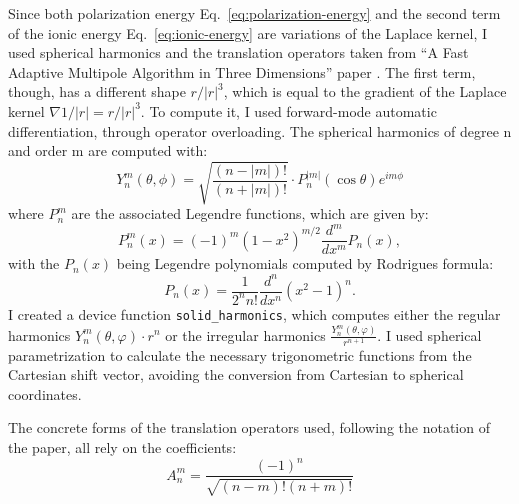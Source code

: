 Since both polarization energy Eq.~\eqref{eq:polarization-energy} and the second term of the ionic energy Eq.~\eqref{eq:ionic-energy} are variations of the Laplace kernel, I used spherical harmonics and the translation operators taken from ``A Fast Adaptive Multipole Algorithm in Three Dimensions'' paper \cite{cheng1999fastadaptive}. 
The first term, though, has a different shape $r/|r|^3$, which is equal to the gradient of the Laplace kernel $\nabla 1/|r| = r/|r|^3$.
To compute it, I used forward-mode automatic differentiation, through operator overloading.
The spherical harmonics of degree n and order m are computed with:
\begin{equation}
    Y_n^m(\theta, \phi) = \sqrt{\frac{(n-|m|)!}{(n+|m|)!}} \cdot P_n^{|m|}(\cos\theta) e^{im\phi}
    \label{eq:spherical-harmonics}
\end{equation}
where $P_n^{m}$ are the associated Legendre functions, which are given by:
\begin{equation}
    P_n^m(x) = (-1)^m (1-x^2)^{m/2} \frac{d^m}{dx^m} P_n(x),
    \label{eq:associated-legendre}
\end{equation}
with the $P_n(x)$ being Legendre polynomials computed by Rodrigues formula:
\begin{equation}
    P_n(x) = \frac{1}{2^n n!} \frac{d^n}{dx^n} (x^2-1)^n.
    \label{eq:legendre-rodrigues}
\end{equation}
I created a device function \texttt{solid\_harmonics}, which computes either the regular harmonics $Y_n^m(\theta,\varphi) \cdot r^n$ or the irregular harmonics $\frac{Y_n^m(\theta,\varphi)}{r^{n+1}}$.
I used spherical parametrization to calculate the necessary trigonometric functions from the Cartesian shift vector, avoiding the conversion from Cartesian to spherical coordinates.

The concrete forms of the translation operators used, following the notation of the paper, all rely on the coefficients:
\begin{equation}
    A_n^m = \frac{(-1)^n}{\sqrt{(n-m)!(n+m)!}}
    \label{eq:translation-coeff-a}
\end{equation}


